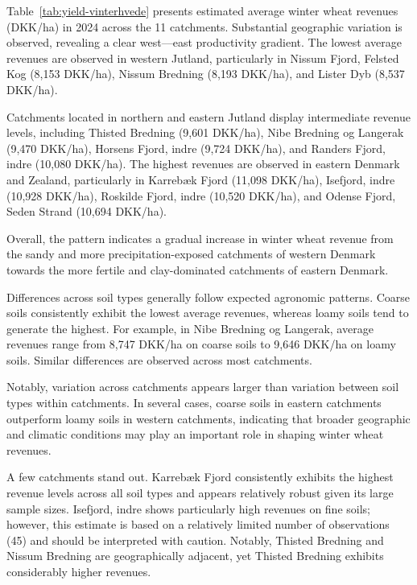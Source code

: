 \documentclass[12pt]{article}
\begin{document}
Table~\ref{tab:yield-vinterhvede} presents estimated average winter wheat revenues (DKK/ha) in 2024 across the 11 catchments. Substantial geographic variation is observed, revealing a clear west--–east productivity gradient. The lowest average revenues are observed in western Jutland, particularly in Nissum Fjord, Felsted Kog (8,153 DKK/ha), Nissum Bredning (8,193 DKK/ha), and Lister Dyb (8,537 DKK/ha). 

Catchments located in northern and eastern Jutland display intermediate revenue levels, including Thisted Bredning (9,601 DKK/ha), Nibe Bredning og Langerak (9,470 DKK/ha), Horsens Fjord, indre (9,724 DKK/ha), and Randers Fjord, indre (10,080 DKK/ha). 
The highest revenues are observed in eastern Denmark and Zealand, particularly in Karrebæk Fjord (11,098 DKK/ha), Isefjord, indre (10,928 DKK/ha), Roskilde Fjord, indre (10,520 DKK/ha), and Odense Fjord, Seden Strand (10,694 DKK/ha). 

Overall, the pattern indicates a gradual increase in winter wheat revenue from the sandy and more precipitation-exposed catchments of western Denmark towards the more fertile and clay-dominated catchments of eastern Denmark. 


Differences across soil types generally follow expected agronomic patterns. 
Coarse soils consistently exhibit the lowest average revenues, whereas loamy soils tend to generate the highest. 
For example, in Nibe Bredning og Langerak, average revenues range from 8,747 DKK/ha on coarse soils to 9,646 DKK/ha on loamy soils. Similar  differences are observed across most catchments.

Notably, variation across catchments appears larger than variation between soil types within catchments. 
In several cases, coarse soils in eastern catchments outperform loamy soils in western catchments, indicating that broader geographic and climatic conditions may play an important role in shaping winter wheat revenues.

A few catchments stand out. Karrebæk Fjord consistently exhibits the highest revenue levels across all soil types and appears relatively robust given its large sample sizes. Isefjord, indre shows particularly high revenues on fine soils; however, this estimate is based on a relatively limited number of observations (45) and should be interpreted with caution. Notably, Thisted Bredning and Nissum Bredning are geographically adjacent, yet Thisted Bredning exhibits considerably higher revenues.
\end{document}
